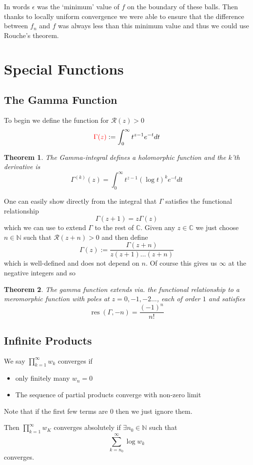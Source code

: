 \documentclass[11pt]{article}
\newcommand{\defeq}{:=}
\DeclareMathOperator{\res}{\text{res}}
\newcommand{\C}{\mathbb{C}}
\newcommand{\N}{\mathbb{N}}
\newenvironment{defin}
	{\begin{mdframed}[backgroundcolor=white, roundcorner=5pt, linewidth=1pt]}
	{\end{mdframed}}
\newcommand{\mdf}[1]{{\color{red} #1}}
\newtheorem{theorem}{Theorem}[section]
\begin{document}
In words $\epsilon$ was the `minimum' value of $f$ on the boundary of these balls.
Then thanks to locally uniform convergence we were able to ensure that the difference between $f_n$ and $f$ was always less than this minimum value and thus we could use Rouche's theorem.

\section{Special Functions}

\subsection{The Gamma Function}
\begin{defin}
	To begin we define the function for $\mathcal{R}(z)> 0$
	\[
		\mdf{\Gamma(z)}\defeq\int_0^\infty t^{z-1}e^{-t}dt
	\]
\end{defin}

\begin{theorem}
The Gamma-integral defines a holomorphic function and the $k$'th derivative is
\[
	\Gamma^{(k)}(z)=\int_0^\infty t^{z-1}(\log t)^k e^{-t}dt
\]
\end{theorem}
One can easily show directly from the integral that $\Gamma$ satisfies the functional relationship
\[
	\Gamma(z+1)=z\Gamma(z)
\]
which we can use to extend $\Gamma$ to the rest of $\C$.
Given any $z\in\C$ we just choose $n\in\N$ such that $\mathcal{R}(z+n)>0$ and then define
\[
	\Gamma(z)\defeq\frac{\Gamma(z+n)}{z(z+1)\dots(z+n)}
\]
which is well-defined and does not depend on $n$.
Of course this gives us $\infty$ at the negative integers and so
\begin{theorem}
The gamma function extends via. the functional relationship to a meromorphic function with poles at $z=0, -1, -2 \dots$, each of order $1$ and satisfies
\[
	\res(\Gamma, -n)=\frac{(-1)^n}{n!}
\]
\end{theorem}
\subsection{Infinite Products}
\begin{defin}
	We say $\prod_{k=1}^\infty  w_k$ \mdf{converges} if
	\begin{itemize}
		\item only finitely many $w_n=0$
		\item The sequence of partial products converge with non-zero limit
	\end{itemize}
	Note that if the first few terms are $0$ then we just ignore them.

	Then $\prod_{k=1}^\infty w_K$ \mdf{converges absolutely} if $\exists n_0\in\N$ such that
	\[
		\sum_{k=n_0}^{\infty}\log w_k
	\]
	converges.
\end{defin}
\end{document}
